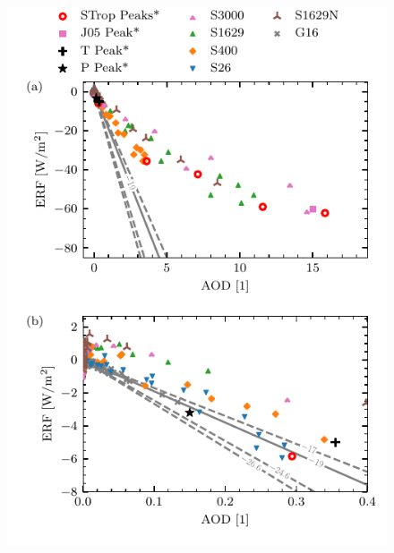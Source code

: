 \documentclass[draft]{agujournal2019}
\begin{document}
  \begin{figure}
    \centering \includegraphics{figure2}


\end{figure}
\end{document}

